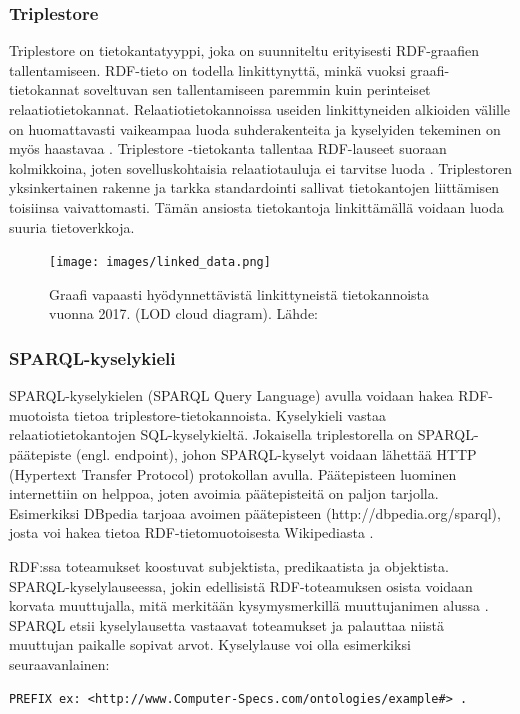 \documentclass[finnish, 12pt, a4paper, elec, utf8, pdfa, online]{aaltothesis}
\begin{document}
{\subsubsection{Triplestore}
Triplestore on tietokantatyyppi, joka on suunniteltu erityisesti RDF-graafien tallentamiseen. RDF-tieto on todella linkittynyttä, minkä vuoksi graafi-tietokannat soveltuvan sen tallentamiseen paremmin kuin perinteiset relaatiotietokannat. Relaatiotietokannoissa useiden linkittyneiden alkioiden välille on huomattavasti vaikeampaa luoda suhderakenteita ja kyselyiden tekeminen on myös haastavaa \cite{triplestore2}. Triplestore -tietokanta tallentaa RDF-lauseet suoraan kolmikkoina, joten sovelluskohtaisia relaatiotauluja ei tarvitse luoda \cite{triplestore}. Triplestoren yksinkertainen rakenne ja tarkka standardointi sallivat tietokantojen liittämisen toisiinsa vaivattomasti. Tämän ansiosta tietokantoja linkittämällä voidaan luoda suuria tietoverkkoja.

\begin{figure}[htb]
\centering
\texttt{[image: images/linked\_data.png]}
\caption{Graafi vapaasti hyödynnettävistä linkittyneistä tietokannoista vuonna 2017. (LOD cloud diagram). Lähde: \cite{LOD_cloud} \label{images/linked_data}}
\end{figure}


\subsubsection{SPARQL-kyselykieli}
SPARQL-kyselykielen (SPARQL Query Language) avulla voidaan hakea RDF-muotoista tietoa triplestore-tietokannoista. Kyselykieli vastaa relaatiotietokantojen SQL-kyselykieltä. Jokaisella triplestorella on SPARQL-päätepiste (engl. endpoint), johon SPARQL-kyselyt voidaan lähettää HTTP (Hypertext Transfer Protocol) protokollan avulla. Päätepisteen luominen internettiin on helppoa, joten avoimia päätepisteitä on paljon tarjolla. Esimerkiksi DBpedia tarjoaa avoimen päätepisteen (http://dbpedia.org/sparql), josta voi hakea tietoa RDF-tietomuotoisesta Wikipediasta \cite{Antoniou}.

RDF:ssa toteamukset koostuvat subjektista, predikaatista ja objektista. SPARQL-kyselylauseessa, jokin edellisistä RDF-toteamuksen osista voidaan korvata muuttujalla, mitä merkitään kysymysmerkillä muuttujanimen alussa \cite{Antoniou}. SPARQL etsii kyselylausetta vastaavat toteamukset ja palauttaa niistä muuttujan paikalle sopivat arvot. Kyselylause voi olla esimerkiksi seuraavanlainen:
\vskip 0.5cm
\begin{lstlisting}[style=codeblock,caption={SPARQL esimerkki.},captionpos=b,label={sparql_esim}]
PREFIX ex: <http://www.Computer-Specs.com/ontologies/example#> .


\end{lstlisting}}
\end{document}

